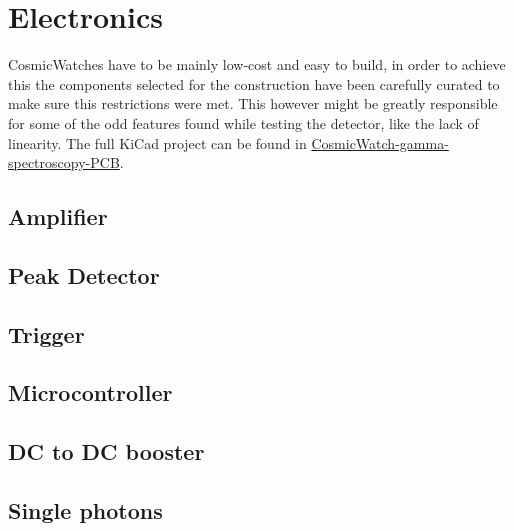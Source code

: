 \chapter{Electronics}

CosmicWatches have to be mainly low-cost and easy to build, in order to achieve this the components selected for the construction have been carefully curated to make sure this restrictions were met. This however might be greatly responsible for some of the odd features found while testing the detector, like the lack of linearity. The full KiCad project can be found in \href{https://github.com/anvargasl/CosmicWatch-gamma-spectroscopy-PCB}{CosmicWatch-gamma-spectroscopy-PCB}.

\section{Amplifier}

\section{Peak Detector}

\section{Trigger}

\section{Microcontroller}

\section{DC to DC booster}

\section{Single photons}